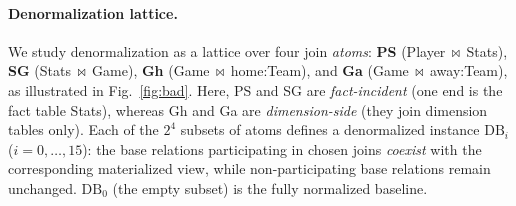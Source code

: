 \documentclass[sigconf]{acmart}
\begin{document}

\paragraph{Denormalization lattice.}
We study denormalization as a lattice over four join \emph{atoms}: \textbf{PS} (\textsf{Player}\,$\bowtie$\,\textsf{Stats}), \textbf{SG} (\textsf{Stats}\,$\bowtie$\,\textsf{Game}), \textbf{Gh} (\textsf{Game}\,$\bowtie$\,home:\textsf{Team}), and \textbf{Ga} (\textsf{Game}\,$\bowtie$\,away:\textsf{Team}), as illustrated in Fig.~\ref{fig:bad}. Here, PS and SG are \emph{fact-incident} (one end is the fact table \textsf{Stats}), whereas Gh and Ga are \emph{dimension-side} (they join dimension tables only).
Each of the $2^4$ subsets of atoms defines a denormalized instance $\mathrm{DB}_i$ ($i=0,\dots,15$): the base relations participating in chosen joins \emph{coexist} with the corresponding materialized view, while non-participating base relations remain unchanged.
$\mathrm{DB}_0$ (the empty subset) is the fully normalized baseline.
\end{document}
